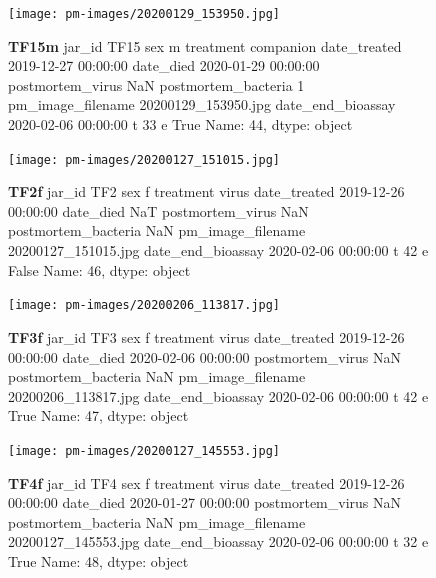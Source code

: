 \begin{figure}[h!]
\centering
\texttt{[image: pm-images/20200129\_153950.jpg]}
\caption{\textbf{TF15m} jar\_id                                TF15
sex                                      m
treatment                        companion
date\_treated           2019-12-27 00:00:00
date\_died              2020-01-29 00:00:00
postmortem\_virus                       NaN
postmortem\_bacteria                      1
pm\_image\_filename      20200129\_153950.jpg
date\_end\_bioassay      2020-02-06 00:00:00
t                                       33
e                                     True
Name: 44, dtype: object}
\end{figure}
\clearpage

\begin{figure}[h!]
\centering
\texttt{[image: pm-images/20200127\_151015.jpg]}
\caption{\textbf{TF2f} jar\_id                                 TF2
sex                                      f
treatment                            virus
date\_treated           2019-12-26 00:00:00
date\_died                              NaT
postmortem\_virus                       NaN
postmortem\_bacteria                    NaN
pm\_image\_filename      20200127\_151015.jpg
date\_end\_bioassay      2020-02-06 00:00:00
t                                       42
e                                    False
Name: 46, dtype: object}
\end{figure}
\clearpage

\begin{figure}[h!]
\centering
\texttt{[image: pm-images/20200206\_113817.jpg]}
\caption{\textbf{TF3f} jar\_id                                 TF3
sex                                      f
treatment                            virus
date\_treated           2019-12-26 00:00:00
date\_died              2020-02-06 00:00:00
postmortem\_virus                       NaN
postmortem\_bacteria                    NaN
pm\_image\_filename      20200206\_113817.jpg
date\_end\_bioassay      2020-02-06 00:00:00
t                                       42
e                                     True
Name: 47, dtype: object}
\end{figure}
\clearpage

\begin{figure}[h!]
\centering
\texttt{[image: pm-images/20200127\_145553.jpg]}
\caption{\textbf{TF4f} jar\_id                                 TF4
sex                                      f
treatment                            virus
date\_treated           2019-12-26 00:00:00
date\_died              2020-01-27 00:00:00
postmortem\_virus                       NaN
postmortem\_bacteria                    NaN
pm\_image\_filename      20200127\_145553.jpg
date\_end\_bioassay      2020-02-06 00:00:00
t                                       32
e                                     True
Name: 48, dtype: object}
\end{figure}
\clearpage

